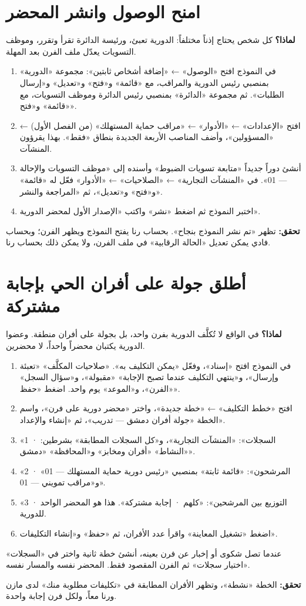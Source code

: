 \section{امنح الوصول وانشر المحضر}
\label{sec:real-access}
\textbf{لماذا؟} كل شخص يحتاج إذناً مختلفاً: الدورية تعبئ، ورئيسة الدائرة تقرأ وتقرر، وموظف التسويات يعدّل ملف الفرن بعد المهلة.
\begin{enumerate}
\item في النموذج افتح «الوصول» ← «إضافة أشخاص ثابتين»: مجموعة «الدورية» بمنصبي رئيس الدورية والمراقب، مع «قائمة» و«فتح» و«تعديل» و«إرسال الطلبات». ثم مجموعة «الدائرة» بمنصبي رئيس الدائرة وموظف التسويات، مع «قائمة» و«فتح».
\item افتح «الإعدادات» ← «الأدوار» ← «مراقب حماية المستهلك» (من الفصل الأول) ← «المسؤولين»، وأضف المناصب الأربعة الجديدة بنطاق «فقط». بهذا يقرؤون المنشآت.
\item أنشئ دوراً جديداً «متابعة تسويات الضبوط» وأسنده إلى «موظف التسويات والإحالة — 01». في «المنشآت التجارية» ← «الصلاحيات» ← «الأدوار» فعّل له «قائمة» و«فتح» و«تعديل»، ثم «المراجعة والنشر».
\item اختبر النموذج ثم اضغط «نشر» واكتب «الإصدار الأول لمحضر الدورية».
\end{enumerate}
\textbf{تحقق:} تظهر «تم نشر النموذج بنجاح». بحساب رنا يفتح النموذج ويظهر الفرن؛ وبحساب فادي يمكن تعديل «الحالة الرقابية» في ملف الفرن، ولا يمكن ذلك بحساب رنا.

\section{أطلق جولة على أفران الحي بإجابة مشتركة}
\label{sec:real-plan}
\textbf{لماذا؟} في الواقع لا تُكلَّف الدورية بفرن واحد، بل بجولة على أفران منطقة. وعضوا الدورية يكتبان محضراً واحداً، لا محضرين.
\begin{enumerate}
\item في النموذج افتح «إسناد»، وفعّل «يمكن التكليف به». «صلاحيات المكلَّف» «تعبئة وإرسال»، و«ينتهي التكليف عندما تصبح الإجابة» «مقبولة»، و«سؤال السجل» «الفرن»، و«الموعد» يوم واحد. اضغط «حفظ».
\item افتح «خطط التكليف» ← «خطة جديدة»، واختر «محضر دورية على فرن»، واسم الخطة «جولة أفران دمشق — تدريب»، ثم «إنشاء والإعداد».
\item «1 · السجلات»: «المنشآت التجارية»، و«كل السجلات المطابقة» بشرطين: «النشاط» «أفران ومخابز» و«المحافظة» «دمشق».
\item «2 · المرشحون»: «قائمة ثابتة» بمنصبي «رئيس دورية حماية المستهلك — 01» و«مراقب تمويني — 01».
\item «3 · التوزيع بين المرشحين»: «كلهم · إجابة مشتركة». هذا هو المحضر الواحد للدورية.
\item اضغط «تشغيل المعاينة» واقرأ عدد الأفران، ثم «حفظ» و«إنشاء التكليفات».
\end{enumerate}
\begin{rcnote}
عندما تصل شكوى أو إخبار عن فرن بعينه، أنشئ خطة ثانية واختر في «السجلات» «اختيار سجلات» ثم الفرن المقصود فقط. المحضر نفسه والمسار نفسه.
\end{rcnote}
\textbf{تحقق:} الخطة «نشطة»، وتظهر الأفران المطابقة في «تكليفات مطلوبة منك» لدى مازن ورنا معاً، ولكل فرن إجابة واحدة.


